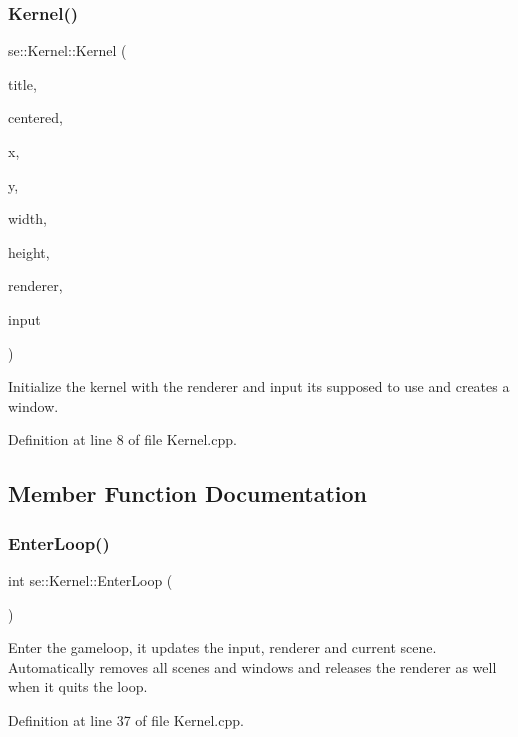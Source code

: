 \subsubsection{\texorpdfstring{Kernel()}{Kernel()}}
{\footnotesize\ttfamily se\+::\+Kernel\+::\+Kernel (\begin{DoxyParamCaption}\item[{const std\+::string \&}]{title,  }\item[{bool}]{centered,  }\item[{int}]{x,  }\item[{int}]{y,  }\item[{int}]{width,  }\item[{int}]{height,  }\item[{\mbox{\hyperlink{classse_1_1_abstract_renderer}{Abstract\+Renderer}} $\ast$}]{renderer,  }\item[{\mbox{\hyperlink{classse_1_1_abstract_input}{Abstract\+Input}} $\ast$}]{input }\end{DoxyParamCaption})}

Initialize the kernel with the renderer and input it\textquotesingle{}s supposed to use and creates a window. 

Definition at line 8 of file Kernel.\+cpp.



\subsection{Member Function Documentation}
\mbox{\label{classse_1_1_kernel_a1faeac6fce02ccd7ff76d94ad78e0754}} 
\subsubsection{\texorpdfstring{Enter\+Loop()}{EnterLoop()}}
{\footnotesize\ttfamily int se\+::\+Kernel\+::\+Enter\+Loop (\begin{DoxyParamCaption}{ }\end{DoxyParamCaption})}

Enter the gameloop, it updates the input, renderer and current scene. Automatically removes all scenes and windows and releases the renderer as well when it quits the loop. 

Definition at line 37 of file Kernel.\+cpp.

\mbox{\label{classse_1_1_kernel_afe100d42354808a757b08a56a0387496}} 
